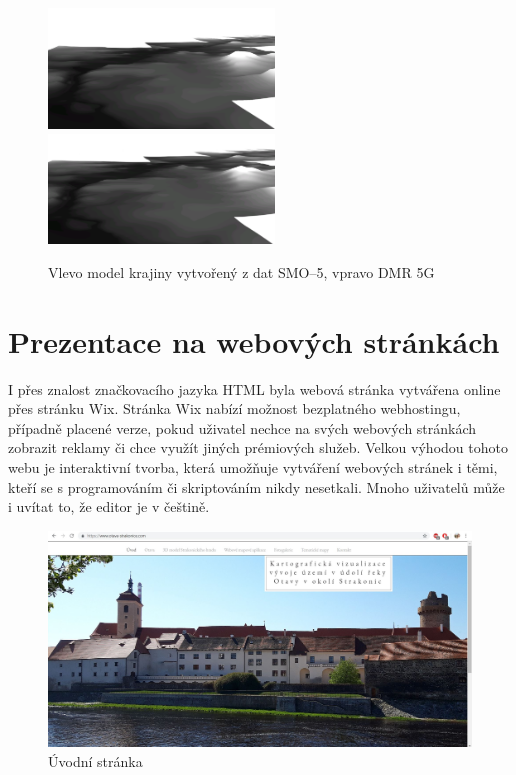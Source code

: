 \documentclass[thesis=M,czech]{FITthesis}[2012/06/26]
\begin{document}
\begin{figure}[htp]
\centering
\includegraphics[width=6cm]{pics/dm_smo5.png}
\includegraphics[width=6cm]{pics/dmr_5g.png}
\caption{Vlevo model krajiny vytvořený z dat SMO–5, vpravo DMR 5G}
\label{obrazek:rozdilvysek}
\end{figure}


\chapter{Prezentace na webových stránkách}
I přes znalost značkovacího jazyka HTML byla webová stránka vytvářena online přes stránku Wix. Stránka Wix nabízí možnost bezplatného webhostingu, případně placené verze, pokud uživatel nechce na svých webových stránkách zobrazit reklamy či chce využít jiných prémiových služeb. Velkou výhodou tohoto webu je interaktivní tvorba, která umožňuje vytváření webových stránek i těmi, kteří se s programováním či skriptováním nikdy nesetkali. Mnoho uživatelů může i uvítat to, že editor je v češtině. 



\begin{figure}[h!]
	\centering
	\includegraphics[width=14cm]{pics/web.jpg}
	\caption{Úvodní stránka}
	\label{obrazek:web}
\end{figure}
\end{document}

